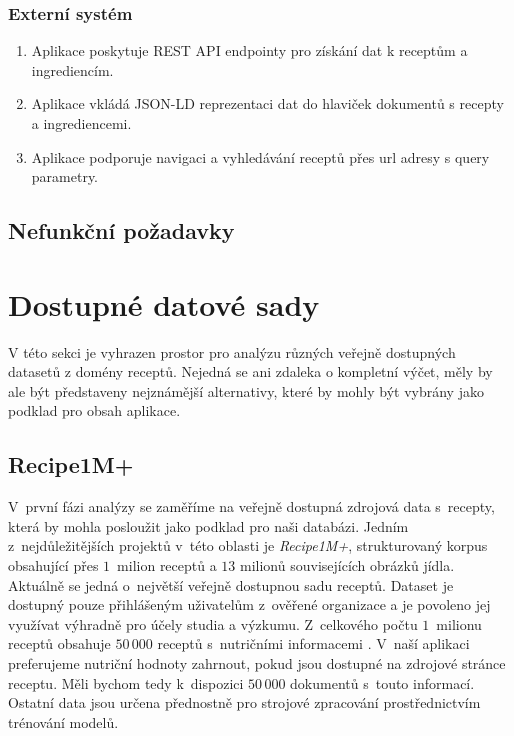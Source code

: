 \subsubsection{Externí systém}

\begin{enumerate}
    \item Aplikace poskytuje REST API endpointy pro získání dat k receptům a ingrediencím.
    \item Aplikace vkládá JSON-LD reprezentaci dat do hlaviček dokumentů s recepty a ingrediencemi.
    \item Aplikace podporuje navigaci a vyhledávání receptů přes url adresy s query parametry.
\end{enumerate}

\subsection{Nefunkční požadavky}

\section{Dostupné datové sady}

V této sekci je vyhrazen prostor pro analýzu různých veřejně dostupných datasetů z domény receptů. Nejedná se ani zdaleka o kompletní výčet, měly by ale být představeny nejznámější alternativy, které by mohly být vybrány jako podklad pro obsah aplikace. 

\subsection{Recipe1M+}

V~první fázi analýzy se zaměříme na veřejně dostupná zdrojová data s~recepty, která by mohla posloužit jako podklad pro naši databázi. Jedním z~nejdůležitějších projektů v~této oblasti je \emph{Recipe1M+}, strukturovaný korpus obsahující přes $1$~milion receptů a $13$ milionů souvisejících obrázků jídla. Aktuálně se jedná o~největší veřejně dostupnou sadu receptů. Dataset je dostupný pouze přihlášeným uživatelům z~ověřené organizace a je povoleno jej využívat výhradně pro účely studia a výzkumu. Z~celkového počtu $1$~milionu receptů obsahuje $50\,000$ receptů s~nutričními informacemi \citep{marin2019learning}. V~naší aplikaci preferujeme nutriční hodnoty zahrnout, pokud jsou dostupné na zdrojové stránce receptu. Měli bychom tedy k~dispozici $50\,000$ dokumentů s~touto informací. Ostatní data jsou určena přednostně pro strojové zpracování prostřednictvím trénování modelů.

